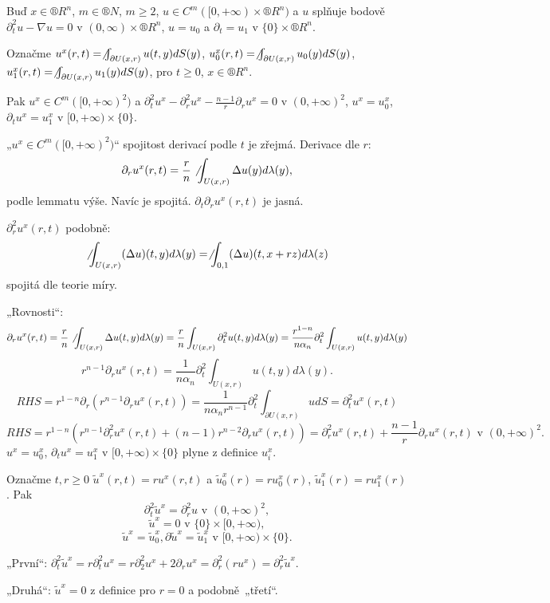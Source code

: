 \documentclass[12pt]{article}					%
\begin{document}
\begin{lemma}
	Buď $x \in ®R^n$, $m \in ®N$, $m ≥ 2$, $u \in C^m([0, +∞) \times ®R^n)$ a $u$ splňuje bodově $\partial_t^2 u - \nabla u = 0$ v $(0, ∞) \times ®R^n$, $u = u_0$ a $\partial_t = u_1$ v $\{0\} \times ®R^n$.

	Označme $u^x(r, t) = \not\int_{\partial U(x, r)} u(t, y) dS(y)$, $u_0^x(r, t) = \not\int_{\partial U(x, r)} u_0(y) dS(y)$, $u_1^x(r, t) = \not\int_{\partial U(x, r)} u_1(y) dS(y)$, pro $t ≥ 0$, $x \in ®R^n$.

	Pak $u^x \in C^m([0, +∞)^2)$ a $\partial_t^2 u^x - \partial_r^2 u^x - \frac{n-1}{r} \partial_r u^x = 0$ v $(0, +∞)^2$, $u^x = u_0^x$, $\partial_t u^x = u_1^x$ v $[0, +∞)\times\{0\}$.

	\begin{dukazin}
		„$u^x \in C^m([0, +∞)^2)$“ spojitost derivací podle $t$ je zřejmá. Derivace dle $r$:
		$$ \partial_r u^x(r, t) = \frac{r}{n} \not\int_{U(x, r)} \Delta u(y) d\lambda(y), $$
		podle lemmatu výše. Navíc je spojitá. $\partial_t\partial_r u^x(r, t)$ je jasná.

		$\partial_r^2 u^x(r, t)$ podobně:
		$$ \not\int_{U(x, r)} (\Delta u)(t, y) d\lambda(y) = \not\int_{0, 1}(\Delta u)(t, x + rz) d\lambda(z) $$
		spojitá dle teorie míry.

		„Rovnosti“:
		$$ \partial_r u^x(r, t) = \frac{r}{n} \not\int_{U(x, r)} \Delta u(t, y) d\lambda(y) = \frac{r}{n} \int_{U(x, r)} \partial_t^2 u(t, y) d\lambda(y) = \frac{r^{1 - n}}{n \alpha_n} \partial_t^2 \int_{U(x, r)} u(t, y) d\lambda(y) $$
		$$ r^{n-1} \partial_r u^x(r, t) = \frac{1}{n\alpha_n} \partial_t^2 \int_{U(x, r)} u(t, y) d\lambda(y). $$
		$$ RHS = r^{1 - n} \partial_r(r^{n-1} \partial_r u^x(r, t)) = \frac{1}{n\alpha_n r^{n-1}} \partial_t^2 \int_{\partial U(x, r)} u dS = \partial_t^2 u^x(r, t) $$
		$$ RHS = r^{1 - n}(r^{n-1} \partial_r^2 u^x(r, t) + (n-1)r^{n-2} \partial_r u^x(r, t)) = \partial_r^2 u^x(r, t) + \frac{n-1}{r} \partial_r u^x(r, t) \text{ v } (0, +∞)^2. $$
		$u^x = u_0^x$, $\partial_t u^x = u_1^x$ v $[0, +∞) \times \{0\}$ plyne z definice $u_i^x$.
	\end{dukazin}
\end{lemma}

\begin{lemma}[Doplnění pro $n=3$]
	Označme $t, r ≥ 0$ $\tilde u^x(r, t) = r u^x(r, t)$ a $\tilde u_0^x(r) = r u_0^x(r)$, $\tilde u_1^x(r) = r u_1^x(r)$. Pak
	$$ \partial_t^2 \tilde u^x = \partial_r^2 u \text{ v } (0, +∞)^2, $$
	$$ \tilde u^x = 0 \text{ v } \{0\} \times [0, +∞), $$
	$$ \tilde u^x = \tilde u_0^x, \partial \tilde u^x = \tilde u_1^x \text{ v } [0, +∞) \times \{0\}. $$

	\begin{dukazin}
		„První“: $\partial_t^2 \tilde u^x = r \partial_t^2 u^x = r\partial_2^2 u^x + 2\partial_r u^x = \partial_r^2 (r u^x) = \partial_r^2 \tilde u^x$.

		„Druhá“: $\tilde u^x = 0$ z definice pro $r = 0$ a podobně „třetí“.
	\end{dukazin}
\end{lemma}
\end{document}
